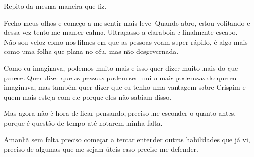 Repito da mesma maneira que fiz.

Fecho meus olhos e começo a me sentir mais leve. Quando abro, estou volitando e dessa vez tento me manter calmo. Ultrapasso a claraboia e finalmente escapo. Não sou veloz como nos filmes em que as pessoas voam super-rápido, é algo mais como uma folha que plana no céu, mas não desgovernada.

Como eu imaginava, podemos muito mais e isso quer dizer muito mais do que parece. Quer dizer que as pessoas podem ser muito mais poderosas do que eu imaginava, mas também quer dizer que eu tenho uma vantagem sobre Crispim e quem mais esteja com ele porque eles não sabiam disso.

Mas agora não é hora de ficar pensando, preciso me esconder o quanto antes, porque é questão de tempo até notarem minha falta.

Amanhã sem falta preciso começar a tentar entender outras habilidades que já vi, preciso de algumas que me sejam úteis caso precise me defender.









